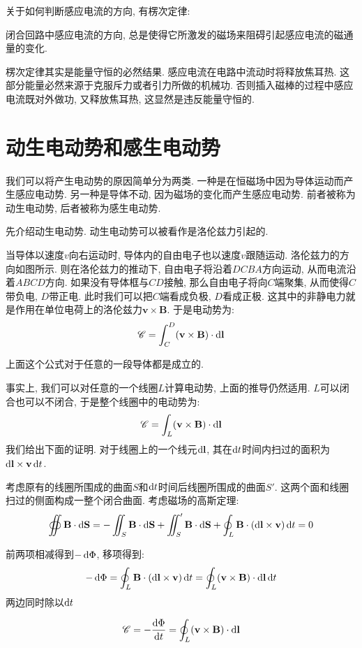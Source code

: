 关于如何判断感应电流的方向, 有楞次定律:
\begin{theorem}[楞次定律]
  闭合回路中感应电流的方向, 总是使得它所激发的磁场来阻碍引起感应电流的磁通量的变化.
\end{theorem}
楞次定律其实是能量守恒的必然结果. 感应电流在电路中流动时将释放焦耳热. 这部分能量必然来源于克服斥力或者引力所做的机械功. 否则插入磁棒的过程中感应电流既对外做功, 又释放焦耳热, 这显然是违反能量守恒的.

\section{动生电动势和感生电动势}
我们可以将产生电动势的原因简单分为两类. 一种是在恒磁场中因为导体运动而产生感应电动势. 另一种是导体不动, 因为磁场的变化而产生感应电动势. 前者被称为动生电动势, 后者被称为感生电动势.

先介绍动生电动势. 动生电动势可以被看作是洛伦兹力引起的.


当导体以速度$v$向右运动时, 导体内的自由电子也以速度$v$跟随运动. 洛伦兹力的方向如图所示. 则在洛伦兹力的推动下, 自由电子将沿着$DCBA$方向运动, 从而电流沿着$ABCD$方向. 如果没有导体框与$CD$接触, 那么自由电子将向$C$端聚集, 从而使得$C$带负电, $D$带正电. 此时我们可以把$C$端看成负极, $D$看成正极. 这其中的非静电力就是作用在单位电荷上的洛伦兹力$\mathbf{v}\times\mathbf{B}$. 于是电动势为:
\[
\mathscr C = \int_C^D (\mathbf{v}\times \mathbf{B})\cdot \mathop{}\!\mathrm{d} \mathbf{l}
\]

上面这个公式对于任意的一段导体都是成立的.

事实上, 我们可以对任意的一个线圈$L$计算电动势, 上面的推导仍然适用. $L$可以闭合也可以不闭合, 于是整个线圈中的电动势为:
\[
\mathscr C = \int_L (\mathbf{v}\times \mathbf{B})\cdot \mathop{}\!\mathrm{d} \mathbf{l}
\]
我们给出下面的证明. 对于线圈上的一个线元$\mathop{}\!\mathrm{d} \mathbf{l}$, 其在$\mathop{}\!\mathrm{d} t$时间内扫过的面积为$\mathop{}\!\mathrm{d} \mathbf{l} \times \mathbf{v} \mathop{}\!\mathrm{d} t$.

考虑原有的线圈所围成的曲面$S$和$\mathop{}\!\mathrm{d} t$时间后线圈所围成的曲面$S'$. 这两个面和线圈扫过的侧面构成一整个闭合曲面. 考虑磁场的高斯定理:
\[
\oiint \mathbf{B} \cdot \mathop{}\!\mathrm{d} \mathbf{S} =
-\iint_S \mathbf{B} \cdot \mathop{}\!\mathrm{d} \mathbf{S} +\iint_S' \mathbf{B} \cdot \mathop{}\!\mathrm{d} \mathbf{S}
+\oint_{L} \mathbf{B} \cdot (\mathop{}\!\mathrm{d} \mathbf{l} \times \mathbf{v}) \mathop{}\!\mathrm{d} t = 0
\]

前两项相减得到$-\mathop{}\!\mathrm{d} \Phi$, 移项得到:
\[
-\mathop{}\!\mathrm{d} \Phi = \oint_L \mathbf{B}\cdot (\mathop{}\!\mathrm{d} \mathbf{l}\times \mathbf{v}) \mathop{}\!\mathrm{d} t = \oint_L (\mathbf{v}\times \mathbf{B})\cdot \mathop{}\!\mathrm{d} \mathbf{l} \mathop{}\!\mathrm{d} t
\]
两边同时除以$\mathop{}\!\mathrm{d} t$

\[
\mathscr C = -\frac{\mathop{}\!\mathrm{d} \Phi}{\mathop{}\!\mathrm{d} t} =  \oint_L (\mathbf{v}\times \mathbf{B})\cdot \mathop{}\!\mathrm{d} \mathbf{l}
\]

